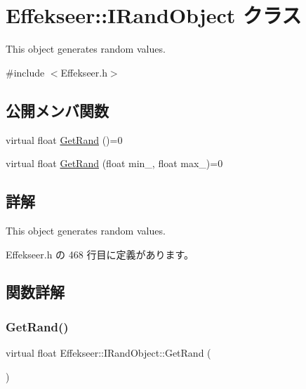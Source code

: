 \hypertarget{class_effekseer_1_1_i_rand_object}{}\section{Effekseer\+:\+:I\+Rand\+Object クラス}
\label{class_effekseer_1_1_i_rand_object}


This object generates random values.  




{\ttfamily \#include $<$Effekseer.\+h$>$}

\subsection*{公開メンバ関数}
\begin{DoxyCompactItemize}
\item 
virtual float \mbox{\hyperlink{class_effekseer_1_1_i_rand_object_aecc4fce270de1c127f19a53b1ca09454}{Get\+Rand}} ()=0
\item 
virtual float \mbox{\hyperlink{class_effekseer_1_1_i_rand_object_a2c7b39779f597094973517df4afa0b48}{Get\+Rand}} (float min\+\_\+, float max\+\_\+)=0
\end{DoxyCompactItemize}


\subsection{詳解}
This object generates random values. 

 Effekseer.\+h の 468 行目に定義があります。



\subsection{関数詳解}
\mbox{\label{class_effekseer_1_1_i_rand_object_aecc4fce270de1c127f19a53b1ca09454}} 
\subsubsection{\texorpdfstring{Get\+Rand()}{GetRand()}\hspace{0.1cm}{\footnotesize\ttfamily [1/2]}}
{\footnotesize\ttfamily virtual float Effekseer\+::\+I\+Rand\+Object\+::\+Get\+Rand (\begin{DoxyParamCaption}{ }\end{DoxyParamCaption})\hspace{0.3cm}{\ttfamily [pure virtual]}}

